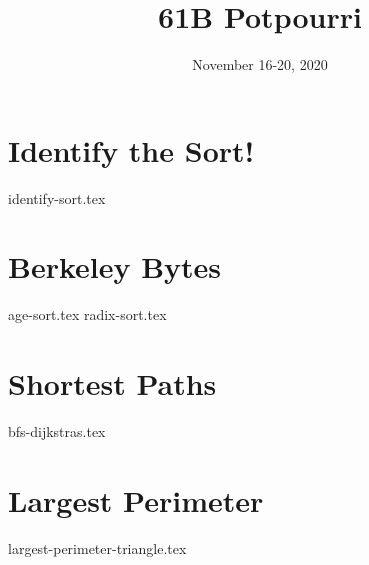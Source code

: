 \documentclass[11pt]{exam}
\title{61B Potpourri}
\date{November 16-20, 2020}
\begin{document}
\maketitle

\section{Identify the Sort!}
\begin{questions}
{identify-sort.tex}
\end{questions}

\newpage
\section{Berkeley Bytes}
\begin{questions}
{age-sort.tex}
{radix-sort.tex}
\end{questions}

\newpage
\section{Shortest Paths}
\begin{questions}
{bfs-dijkstras.tex}
\end{questions}

\newpage
\section{Largest Perimeter}
\begin{questions}
{largest-perimeter-triangle.tex}
\end{questions}
\end{document}
